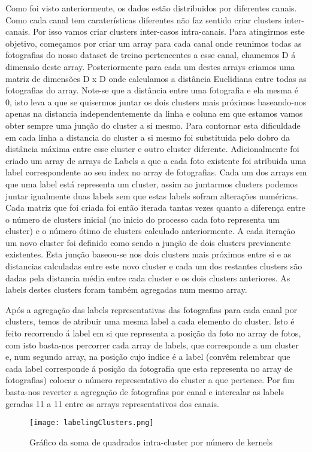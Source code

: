 Como foi visto anteriormente, os dados estão distribuidos por diferentes canais. Como cada canal tem caraterísticas diferentes não faz sentido criar clusters inter-canais. Por isso vamos criar clusters inter-casos intra-canais.\newline
Para atingirmos este objetivo, começamos por criar um array para cada canal onde reunimos todas as fotografias do nosso dataset de treino pertencentes a esse canal, chamemos D á dimensão deste array. Posteriormente para cada um destes arrays criamos uma matriz de dimensões D x D onde calculamos a distância Euclidiana entre todas as fotografias do array. Note-se que a distância entre uma fotografia e ela mesma é 0, isto leva a que se quisermos juntar os dois clusters mais próximos baseando-nos apenas na distancia independentemente da linha e coluna em que estamos vamos obter sempre uma junção do cluster a si mesmo. Para contornar esta dificuldade em cada linha a distancia do cluster a si mesmo foi substituida pelo dobro da distância máxima entre esse cluster e outro cluster diferente. Adicionalmente foi criado um array de arrays de Labels a que a cada foto existente foi atribuida uma label correspondente ao seu index no array de fotografias. Cada um dos arrays  em que uma label está representa um cluster, assim ao juntarmos clusters podemos juntar igualmente duas labels sem que estas labels sofram alterações numéricas.\newline
Cada matriz que foi criada foi então iterada tantas vezes quanto a diferença entre o número de clusters inicial (no inicio do processo cada foto representa um cluster) e o número ótimo de clusters calculado anteriormente. \newline
A cada iteração um novo cluster foi definido como sendo a junção de dois clusters previanente existentes. Esta junção baseou-se nos dois clusters mais próximos entre si e as distancias calculadas entre este novo cluster e cada um dos restantes clusters são dadas pela distancia média entre cada cluster e os dois clusters anteriores. As labels destes clusters foram também agregadas num mesmo array.\newline
\par Após a agregação das labels representativas das fotografias para cada canal por clusters, temos de atribuir uma mesma label a cada elemento do cluster. Isto é feito recorrendo á label em si que representa a posição da foto no array de fotos, com isto basta-nos percorrer cada array de labels, que corresponde a um cluster e, num segundo array, na posição cujo indice é a label (convêm relembrar que cada label corresponde á posição da fotografia que esta representa no array de fotografias) colocar o número representativo do cluster a que pertence.\newline
Por fim basta-nos reverter a agregação de fotografias por canal e intercalar as labels geradas 11 a 11 entre os arrays representativos dos canais.\newline


\begin{figure}[h]
 
	\centering
 	\texttt{[image: labelingClusters.png]} 
	\caption{Gráfico da soma de quadrados intra-cluster por número de kernels}
\end{figure}





